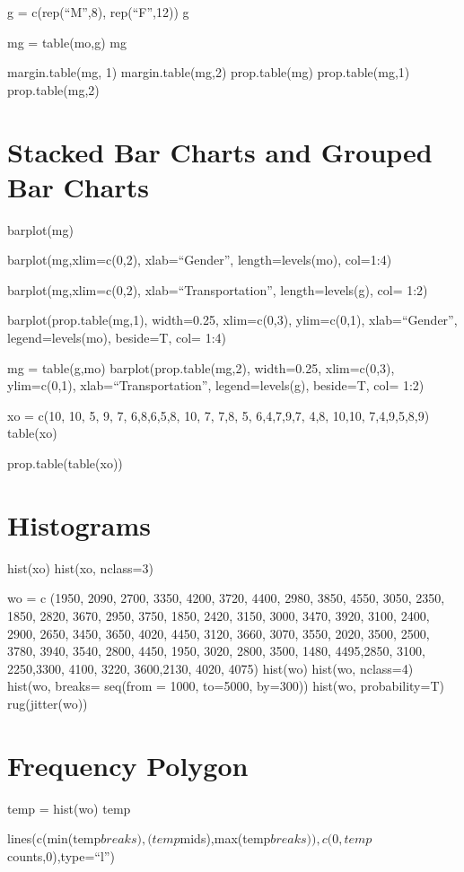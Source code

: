 \documentclass[
]{article}
\begin{document}
g = c(rep(``M'',8), rep(``F'',12)) g

mg = table(mo,g) mg

margin.table(mg, 1) margin.table(mg,2) prop.table(mg) prop.table(mg,1)
prop.table(mg,2)

\section{Stacked Bar Charts and Grouped Bar
Charts}\label{stacked-bar-charts-and-grouped-bar-charts}

barplot(mg)

barplot(mg,xlim=c(0,2), xlab=``Gender'', length=levels(mo), col=1:4)

barplot(mg,xlim=c(0,2), xlab=``Transportation'', length=levels(g), col=
1:2)

barplot(prop.table(mg,1), width=0.25, xlim=c(0,3), ylim=c(0,1),
xlab=``Gender'', legend=levels(mo), beside=T, col= 1:4)

mg = table(g,mo) barplot(prop.table(mg,2), width=0.25, xlim=c(0,3),
ylim=c(0,1), xlab=``Transportation'', legend=levels(g), beside=T, col=
1:2)

xo = c(10, 10, 5, 9, 7, 6,8,6,5,8, 10, 7, 7,8, 5, 6,4,7,9,7, 4,8, 10,10,
7,4,9,5,8,9) table(xo)

prop.table(table(xo))

\section{Histograms}\label{histograms}

hist(xo) hist(xo, nclass=3)

wo = c (1950, 2090, 2700, 3350, 4200, 3720, 4400, 2980, 3850, 4550,
3050, 2350, 1850, 2820, 3670, 2950, 3750, 1850, 2420, 3150, 3000, 3470,
3920, 3100, 2400, 2900, 2650, 3450, 3650, 4020, 4450, 3120, 3660, 3070,
3550, 2020, 3500, 2500, 3780, 3940, 3540, 2800, 4450, 1950, 3020, 2800,
3500, 1480, 4495,2850, 3100, 2250,3300, 4100, 3220, 3600,2130, 4020,
4075) hist(wo) hist(wo, nclass=4) hist(wo, breaks= seq(from = 1000,
to=5000, by=300)) hist(wo, probability=T) rug(jitter(wo))

\section{Frequency Polygon}\label{frequency-polygon}

temp = hist(wo) temp

lines(c(min(temp\(breaks), (temp\)mids),max(temp\(breaks)), c(0,temp\)counts,0),type=``l'')
\end{document}
